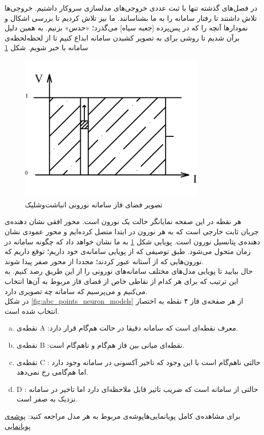 در فصل‌های گذشته تنها با ثبت عددی خروجی‌های مدلسازی سروکار داشتیم. خروجی‌ها تلاش داشتند تا رفتار سامانه را به ما بشناسانند. ما نیز تلاش کردیم تا بررسی اشکال و نمودارها آنچه را که در پس‌پرده [جعبه سیاه] می‌گذرد؛ «حدس» بزنیم. به همین دلیل برآن شدیم تا روشی برای به تصویر کشیدن سامانه ابداع کنیم تا از لحظه‌لحظه‌ی سامانه با خبر شویم. شکل \ref{fig:if_animation_plot}

\begin{figure}[!h]
	\centering
	\includegraphics[width =0.8\textwidth]{../papers_studies/figs/IF/IF_phase_space-Model.png}
	\caption{تصویر فضای فاز سامانه نورونی انباشت‌وشلیک}
	\label{fig:if_animation_plot}
\end{figure}

هر نقطه در این صفحه نمایانگر حالت یک نورون است. محور افقی نشان دهنده‌ی جریان ثابت خارجی است که به هر نورون در ابتدا متصل کرده‌ایم و محور عمودی نشان دهنده‌ی پتانسیل نورون است. پویایی شکل \ref{fig:if_animation_plot} به ما نشان خواهد داد که چگونه سامانه در زمان متحول می‌شود. طبق توصیفی که از پویایی سامانه‌ی خود داریم؛ توقع داریم که نورون‌هایی که از آستانه عبور کردند؛ مجددا از محور صفر پیدا شوند.\\

حال بیایید تا پویایی مدل‌های مختلف سامانه‌های نورونی را از این طریق رصد کنیم. به این ترتیب که برای هر کدام از نقاطی خاص از فضای فاز مربوط به آن‌ها انتخاب می‌کنیم و می‌پرسیم که سامانه چه تصویری دارد.\\
در شکل‌ 
\ref{fig:abc_points_neuron_models}
از هر صفحه‌ی فاز ۴ نقطه به اختصار انتخاب شده است.
\begin{enumerate}[a.]
	\item 
	نقطه‌ی 
	A
	:معرف نقطه‌ای است که سامانه دقیقا در حالت هم‌گام قرار دارد.
	\item 
	نقطه‌ی
	B
	:نقطه‌ای میانی بین فاز هم‌گام و ناهم‌گام است.
	\item 
	نقطه‌ی
	C
	: حالتی ناهم‌گام است با این وجود که تاخیر آکسونی در سامانه وجود دارد اما هم‌گامی رخ نمی‌دهد.
	\item 
	D
	: حالتی از سامانه است که ضریب تاثیر قابل ملاحظه‌ای دارد اما تاخیر در سامانه نزدیک به صفر است.
\end{enumerate}
برای مشاهده‌ی کامل پویانمایی‌هاپوشه‌ی مربوط به هر مدل مراجعه کنید:
\href{run://..//scripts//all_neurons_model_in_one_place//animations//sea_shore//black_white}{پوشه‌ی پویانمایی}

